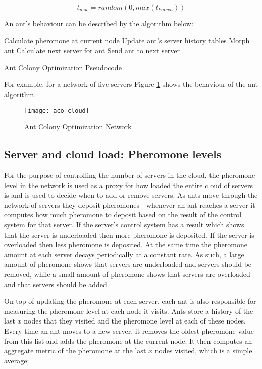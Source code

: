 \documentclass[conference]{IEEEtran}
\begin{document}
\begin{equation}
t_{new} = random(0, max(t_{known}))
\label{eq:randomnew}
\end{equation}

An ant's behaviour can be described by the algorithm below:

\begin{algorithm}
\begin{algorithmic}
	\State Calculate pheromone at current node
	\State Update ant's server history tables
		\State Morph ant
	\Else
		\State Calculate next server for ant
		\State Send ant to next server
	\EndIf
\end{algorithmic}
\caption{Ant Colony Optimization Pseudocode}\label{ant:pseudocode}
\end{algorithm}

For example, for a network of five servers Figure \ref{fig:antnetwork} shows the behaviour of the ant algorithm.

\begin{figure}
	\centering
	\texttt{[image: aco\_cloud]}
	\caption{Ant Colony Optimization Network}
	\label{fig:antnetwork}
\end{figure}

\subsection{Server and cloud load: Pheromone levels}

For the purpose of controlling the number of servers in the cloud, the pheromone level in the network is used as a proxy for how loaded the entire cloud of servers is and is used to decide when to add or remove servers. As ants move through the network of servers they deposit pheromones - whenever an ant reaches a server it computes how much pheromone to deposit based on the result of the control system for that server. If the server's control system has a result which shows that the server is underloaded then more pheromone is deposited. If the server is overloaded then less pheromone is deposited. At the same time the pheromone amount at each server decays periodically at a constant rate. As such, a large amount of pheromone shows that servers are underloaded and servers should be removed, while a small amount of pheromone shows that servers are overloaded and that servers should be added.

On top of updating the pheromone at each server, each ant is also responsible for measuring the pheromone level at each node it visits. Ants store a history of the last $x$ nodes that they visited and the pheromone level at each of these nodes. Every time an ant moves to a new server, it removes the oldest pheromone value from this list and adds the pheromone at the current node. It then computes an aggregate metric of the pheromone at the last $x$ nodes visited, which is a simple average:
\end{document}
